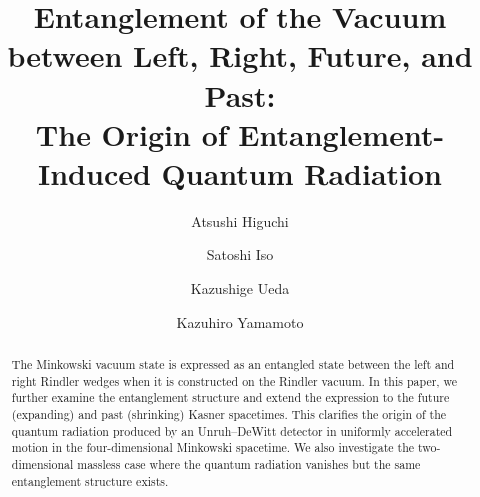 \documentclass[aps,prd,preprintnumbers,nofootinbib,showpacs]{revtex4}%
\begin{document}
\providecommand{\abs}[1]{\lvert#1\rvert}
\providecommand{\bd}[1]{\boldsymbol{#1}}

\vspace{2cm}
\title{Entanglement of the Vacuum between Left, Right, Future, and Past: \\
The Origin of Entanglement-Induced Quantum Radiation}
\vspace{1cm}

\author{Atsushi Higuchi}

\author{Satoshi Iso}

\author{Kazushige Ueda}

\author{Kazuhiro Yamamoto}


\begin{abstract} 
The Minkowski vacuum state is expressed as an entangled state 
between the left and right Rindler wedges
when it is constructed on the Rindler vacuum. 
In this paper, we further examine the entanglement structure and extend the expression  
to the future (expanding) and past (shrinking) Kasner spacetimes.
This clarifies the origin of the quantum radiation produced by an Unruh--DeWitt detector 
in uniformly accelerated motion in the four-dimensional Minkowski spacetime.  
We also investigate the two-dimensional massless case where the quantum radiation vanishes
but the same entanglement structure exists.
\end{abstract} 

\maketitle

\def\I{{\rm I}}
\def\R{{\rm R}}
\def\II{{\rm II}}
\def\III{{\rm III}}
\def\IV{{\rm IV}}
\def\L{{\rm L}}
\def\F{{\rm F}}
\def\P{{\rm P}}
\def\d{{\rm d}}
\def\s{{\rm s}}
\end{document}
